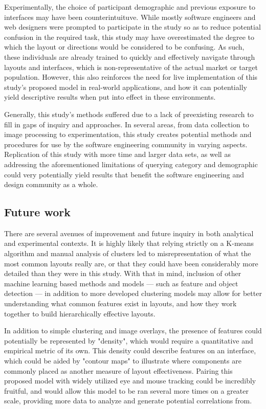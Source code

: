 \documentclass[conference]{IEEEtran}
\begin{document}
Experimentally, the choice of participant demographic and previous exposure to interfaces may have been counterintuituve. While mostly software engineers and web designers were prompted to participate in the study so as to reduce potential confusion in the required task, this study may have overestimated the degree to which the layout or directions would be considered to be confusing. As such, these individuals are already trained to quickly and effectively navigate through layouts and interfaces, which is non-representative of the actual market or target population. However, this also reinforces the need for live implementation of this study's proposed model in real-world applications, and how it can potentially yield descriptive results when put into effect in these environments.

Generally, this study's methods suffered due to a lack of preexisting research to fill in gaps of inquiry and approaches. In several areas, from data collection to image processing to experimentation, this study creates potential methods and procedures for use by the software engineering community in varying aspects. Replication of this study with more time and larger data sets, as well as addressing the aforementioned limitations of querying category and demographic could very potentially yield results that benefit the software engineering and design community as a whole.

\subsection{Future work}

There are several avenues of improvement and future inquiry in both analytical and experimental contexts. It is highly likely that relying strictly on a K-means algorithm and manual analysis of clusters led to misrepresentation of what the most common layouts really are, or that they could have been considerably more detailed than they were in this study. With that in mind, inclusion of other machine learning based methods and models — such as feature and object detection — in addition to more developed clustering models may allow for better understanding what common features exist in layouts, and how they work together to build hierarchically effective layouts.

In addition to simple clustering and image overlays, the presence of features could potentially be represented by "density", which would require a quantitative and empirical metric of its own. This density could describe features on an interface, which could be aided by "contour maps" to illustrate where components are commonly placed as another measure of layout effectiveness. Pairing this proposed model with widely utilized eye and mouse tracking could be incredibly fruitful, and would allow this model to be ran several more times on a greater scale, providing more data to analyze and generate potential correlations from.
\end{document}
